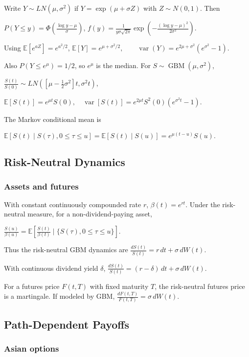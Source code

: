 Write $Y\sim LN(\mu,\sigma^2)$ if $Y=\exp(\mu+\sigma Z)$ with $Z\sim N(0,1)$. Then

$P(Y\le y)=\Phi\left(\frac{\log y-\mu}{\sigma}\right)$,
$f(y)=\frac{1}{y\sigma\sqrt{2\pi}}\exp\left(-\frac{(\log y-\mu)^2}{2\sigma^2}\right)$.

Using $\mathbb{E}[e^{aZ}]=e^{a^2/2}$,
$\mathbb{E}[Y]=e^{\mu+\sigma^2/2},\qquad \operatorname{var}(Y)=e^{2\mu+\sigma^2}(e^{\sigma^2}-1)$.

Also $P(Y\le e^\mu)=1/2$, so $e^\mu$ is the median. For $S\sim\operatorname{GBM}(\mu,\sigma^2)$,

$\frac{S(t)}{S(0)}\sim LN\left(\left[\mu-\frac12\sigma^2\right]t,\sigma^2t\right)$,

$\mathbb{E}[S(t)]=e^{\mu t}S(0),\quad \operatorname{var}[S(t)]=e^{2\mu t}S^2(0)(e^{\sigma^2t}-1)$.

The Markov conditional mean is

$\mathbb{E}[S(t)\mid S(\tau),0\le\tau\le u]=\mathbb{E}[S(t)\mid S(u)]=e^{\mu(t-u)}S(u)$.

\subsection{Risk-Neutral Dynamics}

\subsubsection*{Assets and futures}

With constant continuously compounded rate $r$, $\beta(t)=e^{rt}$. Under the risk-neutral measure, for a non-dividend-paying asset,

$\frac{S(u)}{\beta(u)}=\mathbb{E}\left[\frac{S(t)}{\beta(t)}\mid \{S(\tau),0\le\tau\le u\}\right]$.

Thus the risk-neutral GBM dynamics are
$\frac{dS(t)}{S(t)}=r\,dt+\sigma\,dW(t)$.

With continuous dividend yield $\delta$,
$\frac{dS(t)}{S(t)}=(r-\delta)\,dt+\sigma\,dW(t)$.

For a futures price $F(t,T)$ with fixed maturity $T$, the risk-neutral futures price is a martingale. If modeled by GBM,
$\frac{dF(t,T)}{F(t,T)}=\sigma\,dW(t)$.

\subsection{Path-Dependent Payoffs}

\subsubsection*{Asian options}

